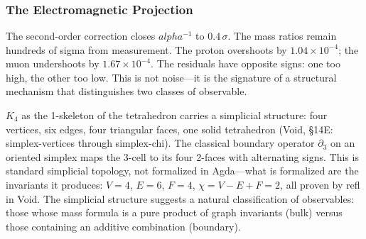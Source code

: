 \documentclass[11pt,a4paper]{book}
\def\alpha{alpha}%
\def\texttt#1{#1}%
\begin{document}
\begin{code}
\\
%
\>[2]\AgdaSymbol{;}\AgdaSpace{}%
%
\>[26]\AgdaSymbol{=}\AgdaSpace{}%
\<%
\\
%
\>[2]\AgdaSymbol{;}\AgdaSpace{}%
%
\>[26]\AgdaSymbol{=}\AgdaSpace{}%
\<%
\\
%
\>[2]\AgdaSymbol{;}\AgdaSpace{}%
%
\>[26]\AgdaSymbol{=}\AgdaSpace{}%
\<%
\\
%
\>[2]\AgdaSymbol{;}\AgdaSpace{}%
%
\>[26]\AgdaSymbol{=}\AgdaSpace{}%
\<%
\\
%
\>[2]\AgdaSymbol{;}\AgdaSpace{}%
%
\>[25]\AgdaSymbol{=}\AgdaSpace{}%
\<%
\\
%
\>[2]\AgdaSymbol{;}\AgdaSpace{}%
%
\>[25]\AgdaSymbol{=}\AgdaSpace{}%
\<%
\\
%
\>[2]\AgdaSymbol{;}\AgdaSpace{}%
%
\>[25]\AgdaSymbol{=}\AgdaSpace{}%
\<%
\\
%
\>[2]\AgdaSymbol{\}}\<%
\end{code}

\subsubsection*{The Electromagnetic Projection}

The second-order correction closes $\alpha^{-1}$ to $0.4\,\sigma$.  The mass
ratios remain hundreds of sigma from measurement.  The proton overshoots by
$1.04 \times 10^{-4}$; the muon undershoots by $1.67 \times 10^{-4}$.  The
residuals have opposite signs: one too high, the other too low.  This is not
noise---it is the signature of a structural mechanism that distinguishes two
classes of observable.

$K_4$ as the 1-skeleton of the tetrahedron carries a simplicial
structure: four vertices, six edges, four triangular faces, one
solid tetrahedron (Void, \S14E: simplex-vertices through simplex-chi).
The classical boundary operator $\partial_3$ on an oriented simplex
maps the 3-cell to its four 2-faces with alternating signs.
This is standard simplicial topology, not formalized in Agda---what
is formalized are the invariants it produces: $V = 4$, $E = 6$,
$F = 4$, $\chi = V - E + F = 2$, all proven by \texttt{refl} in Void.
The simplicial structure suggests a natural classification of
observables: those whose mass formula is a pure product of graph
invariants (bulk) versus those containing an additive combination
(boundary).
\end{document}
